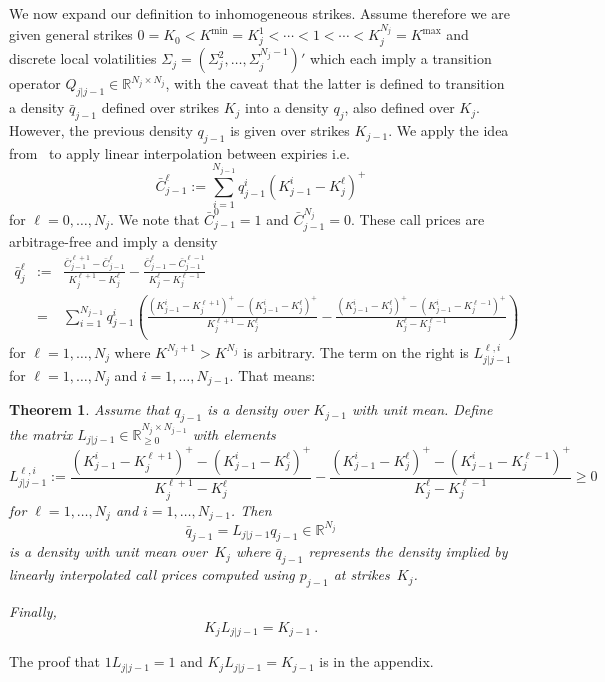 \documentclass[twoside]{article}
\DeclareRobustCommand{\R}{\mathbb{R}}
\theoremstyle{plain}
\newtheorem{theorem}{Theorem}[section]        %
\theoremstyle{definition}
\theoremstyle{remark}
\begin{document}
We now expand our definition to inhomogeneous strikes. 
Assume therefore we are given general strikes $0=K_0<K^{\min}=K^1_j<\cdots<1<\cdots<K^{N_j}_j=K^{\max}$
    and discrete local volatilities $\Sigma_j=(\Sigma^2_j,\ldots,\Sigma^{N_j-1}_j)'$
    which each imply a transition operator $Q_{j|j-1}\in\R^{N_j\times N_j}$, with the caveat that the latter is defined
    to transition a density $\bar q_{j-1}$ defined over strikes $K_j$ into a density $q_j$, also
    defined over $K_j$. However, the previous density $q_{j-1}$ is given over strikes $K_{j-1}$.
We apply the idea from~\cite{DLV} to apply linear interpolation between expiries i.e.
\begin{equation}\label{eq:barcintlp}
    \bar C_{j-1}^\ell := \sum_{i=1}^{N_{j-1}} q_{j-1}^i ( K^i_{j-1} - K^\ell_j )^+    
\end{equation}
for $\ell=0,\ldots,N_j$. We note that $\bar C^{0}_{j-1} = 1$ and $\bar C^{N_j}_{j-1} = 0$. These call prices are arbitrage-free and imply a density
\begin{eqnarray*}
    \bar q^\ell_j & := &
        \frac{ \bar C_{j-1}^{\ell+1} - \bar C_{j-1}^{\ell} }{ K^{\ell+1}_j - K^{\ell}_j }
        - 
        \frac{ \bar C_{j-1}^{\ell} - \bar C_{j-1}^{\ell-1} }{ K^{\ell}_j - K^{\ell-1}_j }
        \\
        &  = &
        \sum_{i=1}^{N_{j-1}} q_{j-1}^i
        \left( 
        \frac{ ( K^i_{j-1} - K^{\ell+1}_j )^+ - ( K^i_{j-1} - K^\ell_j )^+ }{ K^{\ell+1}_j - K^{\ell}_j }
        -
        \frac{ ( K^i_{j-1} - K^{\ell}_j )^+ - ( K^i_{j-1} - K^{\ell-1}_j )^+ }{ K^{\ell}_j - K^{\ell-1}_j }
        \right)
\end{eqnarray*}
for $\ell=1,\ldots,N_j$ where $K^{N_j+1} > K^{N_j}$ is arbitrary. The term on the right is $L^{\ell,i}_{j|j-1}$
for $\ell=1,\ldots,N_j$ and $i=1,\ldots,N_{j-1}$. That means:

\begin{theorem}\label{th:lintransition}
    Assume that $q_{j-1}$ is a density over $K_{j-1}$ with unit mean.
    Define the matrix $L_{j|j-1} \in \R^{N_j\times N_{j-1}}_{\geq0}$ with elements
    \begin{equation}\label{eq:L}
        L_{j|j-1}^{\ell,i} := 
        \frac{ ( K^i_{j-1} - K^{\ell+1}_j )^+ - ( K^i_{j-1} - K^\ell_j )^+ }{ K^{\ell+1}_j - K^{\ell}_j }
        -
        \frac{ ( K^i_{j-1} - K^{\ell}_j )^+ - ( K^i_{j-1} - K^{\ell-1}_j )^+ }{ K^{\ell}_j - K^{\ell-1}_j }
        \geq 0
    \end{equation}
    for $\ell=1,\ldots,N_j$ and $i=1,\ldots,N_{j-1}$.
    Then
    $$
        \bar q_{j-1} = L_{j|j-1} q_{j-1} \in \R^{N_j} 
    $$
    is a density with unit mean over~$K_j$ where $\bar q_{j-1}$ represents the density
    implied by linearly interpolated call prices computed using $p_{j-1}$ at strikes~$K_j$.
    
    Finally,
    $$
        K_j L_{j|j-1} = K_{j-1} \ .
    $$
\end{theorem}
\noindent 
The proof that $1L_{j|j-1}=1$ and $ K_j L_{j|j-1} = K_{j-1}$ is in the appendix.
\end{document}
